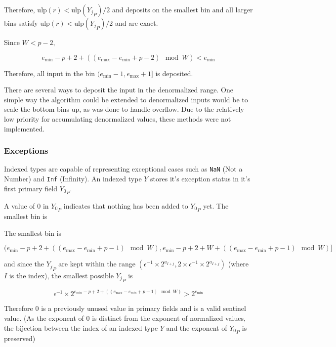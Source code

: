 \documentclass[12pt]{article}
\providecommand{\min}{\ensuremath{\text{min}}}
\providecommand{\max}{\ensuremath{\text{max}}}
\providecommand{\ulp}{\ensuremath{\text{ulp}}}
\theoremstyle{plain}
\begin{document}
        Therefore, $\ulp(r) < \ulp({Y_j}_P)/2$ and deposits on the smallest bin and all larger bins satisfy $\ulp(r) < \ulp({Y_j}_P)/2$ and are exact.

      Since $W < p - 2$,

      \begin{equation*}
      e_{\min} - p + 2 + ((e_{\max} - e_{\min} + p - 2)\mod W) < e_{\min}
      \end{equation*}

      Therefore, all input in the bin $(e_{\min} - 1, e_{\max} + 1]$ is deposited.

      There are several ways to deposit the input in the denormalized range. One simple way the algorithm could be extended to denormalized inputs would be to scale the bottom bins up, as was done to handle overflow. Due to the relatively low priority for accumulating denormalized values, these methods were not implemented.

    \subsubsection{Exceptions}
      Indexed types are capable of representing exceptional cases such as \verb|NaN| (Not a Number) and \verb|Inf| (Infinity). An indexed type $Y$ stores it's exception status in it's first primary field ${Y_0}_P$.

      A value of $0$ in ${Y_0}_P$ indicates that nothing has been added to ${Y_0}_P$ yet. The smallest bin is

      The smallest bin is

      \begin{equation*}
      (e_{\min} - p + 2 + ((e_{\max} - e_{\min} + p - 1 ) \mod W), e_{\min} - p + 2 + W + ((e_{\max} - e_{\min} + p - 1)\mod W)]
      \end{equation*}

      and since the ${Y_j}_P$ are kept within the range $(\epsilon^{-1} \times 2^{a_{I + j}}, 2 \times \epsilon^{-1} \times 2^{a_{I + j}})$ (where $I$ is the index), the smallest possible ${Y_j}_P$ is

      \begin{equation*}
      \epsilon^{-1} \times 2^{e_{\min} - p + 2 + ((e_{\max} - e_{\min} + p - 1)\mod W)} > 2^{e_{\min}}
      \end{equation*}

      Therefore $0$ is a previously unused value in primary fields and is a valid sentinel value. (As the exponent of $0$ is distinct from the exponent of normalized values, the bijection between the index of an indexed type $Y$ and the exponent of ${Y_0}_P$ is preserved)
\end{document}

